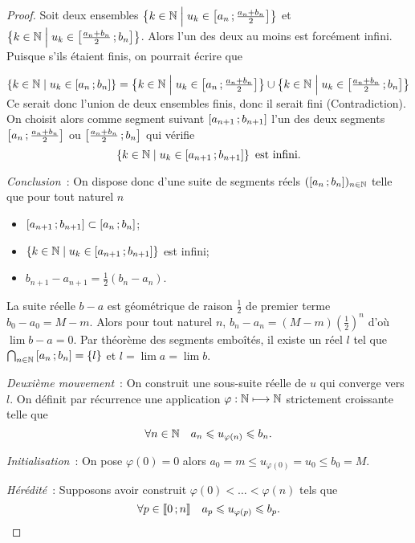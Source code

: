 \begin{proof}
Soit deux ensembles \(\left\{k \in \mathbb{N}\mathrel{}\middle|\mathrel{}u_k \in \left[ a_n \, ;  \frac{a_n+b_n}{2} \right]\right\}\) et \(\left\{k \in \mathbb{N}\mathrel{}\middle|\mathrel{}u_k \in \left[ \frac{a_n+b_n}{2} \, ;  b_n \right]\right\}\). Alors l'un des deux au moins est forcément infini. Puisque s'ils étaient finis, on pourrait écrire que

\(\left\{k \in \mathbb{N}\mathrel{}\middle|\mathrel{}u_k \in \left[ a_n \, ;  b_n \right]\right\}= \left\{k \in \mathbb{N}\mathrel{}\middle|\mathrel{}u_k \in \left[ a_n \, ;  \frac{a_n+b_n}{2} \right]\right\} \cup \left\{k \in \mathbb{N}\mathrel{}\middle|\mathrel{}u_k \in \left[ \frac{a_n+b_n}{2} \, ;  b_n \right]\right\}\)
Ce serait donc l'union de deux ensembles finis, donc il serait fini (Contradiction). On choisit alors comme segment suivant \(\left[ a_{n+1} \, ;  b_{n+1} \right]\) l'un des deux segments \(\left[ a_n \, ;  \frac{a_n+b_n}{2} \right]\) ou \(\left[ \frac{a_n+b_n}{2} \, ;  b_n \right]\) qui vérifie
\begin{equation}
  \left\{k \in \mathbb{N}\mathrel{}\middle|\mathrel{}u_k \in \left[ a_{n+1} \, ;  b_{n+1} \right]\right\} \text{~est infini}.
\end{equation}

\emph{Conclusion}~: On dispose donc d'une suite de segments réels \((\left[ a_n \, ;  b_n \right])_{n \in \mathbb{N}}\) telle que pour tout naturel \(n\)
\begin{itemize}
\item \(\left[ a_{n+1} \, ;  b_{n+1} \right] \subset \left[ a_{n} \, ;  b_{n} \right]\);
\item \(\left\{k \in \mathbb{N}\mathrel{}\middle|\mathrel{}u_k \in \left[ a_{n+1} \, ;  b_{n+1} \right]\right\}\) est infini;
\item \(b_{n+1}-a_{n+1}=\frac{1}{2}(b_n-a_n)\).
\end{itemize}

La suite réelle \(b-a\) est géométrique de raison \(\frac{1}{2}\) de premier terme \(b_0-a_0=M-m\). Alors pour tout naturel \(n\), \(b_n-a_n=(M-m) \left(\frac{1}{2}\right)^n\) d'où \(\lim b-a=0\). Par théorème des segments emboîtés, il existe un réel \(l\) tel que \(\bigcap_{n \in \mathbb{N}} \left[ a_{n} \, ;  b_{n} \right]=\{l\}\) et \(l=\lim a = \lim b\).

\emph{Deuxième mouvement}~: On construit une sous-suite réelle de \(u\) qui converge vers \(l\). On définit par récurrence une application \(\varphi : \mathbb{N} \longmapsto \mathbb{N}\) strictement croissante telle que
\begin{equation}
  \forall n \in \mathbb{N} \quad a_n \leqslant u_{\varphi(n)} \leqslant b_n.
\end{equation}

\emph{Initialisation}~: On pose \(\varphi(0)=0\) alors \(a_0=m \leqslant u_{\varphi(0)}=u_{0} \leqslant b_0=M\).

\emph{Hérédité}~: Supposons avoir construit \(\varphi(0) < \ldots < \varphi(n)\) tels que
\begin{equation}
  \forall p \in \mathopen{\llbracket}0\mathclose{}\mathpunct{};n\mathclose{\rrbracket} \quad a_p \leqslant u_{\varphi(p)} \leqslant b_p.
\end{equation}


\end{proof}
